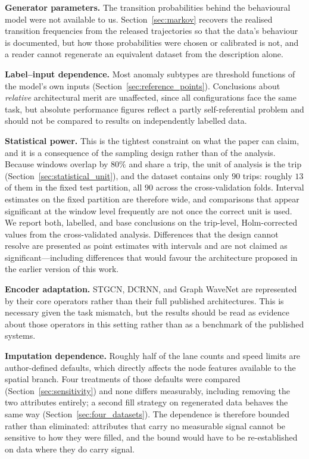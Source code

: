 \documentclass[journal]{IEEEtran}
\begin{document}
\textbf{Generator parameters.} The transition probabilities behind the behavioural model were not available to us. Section~\ref{sec:markov} recovers the realised transition frequencies from the released trajectories so that the data's behaviour is documented, but how those probabilities were chosen or calibrated is not, and a reader cannot regenerate an equivalent dataset from the description alone.

\textbf{Label--input dependence.} Most anomaly subtypes are threshold functions of the model's own inputs (Section~\ref{sec:reference_points}). Conclusions about \emph{relative} architectural merit are unaffected, since all configurations face the same task, but absolute performance figures reflect a partly self-referential problem and should not be compared to results on independently labelled data.

\textbf{Statistical power.} This is the tightest constraint on what the paper can claim, and it is a consequence of the sampling design rather than of the analysis. Because windows overlap by $80\%$ and share a trip, the unit of analysis is the trip (Section~\ref{sec:statistical_unit}), and the dataset contains only $90$ trips: roughly $13$ of them in the fixed test partition, all $90$ across the cross-validation folds. Interval estimates on the fixed partition are therefore wide, and comparisons that appear significant at the window level frequently are not once the correct unit is used. We report both, labelled, and base conclusions on the trip-level, Holm-corrected values from the cross-validated analysis. Differences that the design cannot resolve are presented as point estimates with intervals and are not claimed as significant---including differences that would favour the architecture proposed in the earlier version of this work.

\textbf{Encoder adaptation.} STGCN, DCRNN, and Graph WaveNet are represented by their core operators rather than their full published architectures. This is necessary given the task mismatch, but the results should be read as evidence about those operators in this setting rather than as a benchmark of the published systems.

\textbf{Imputation dependence.} Roughly half of the lane counts and speed limits are author-defined defaults, which directly affects the node features available to the spatial branch. Four treatments of those defaults were compared (Section~\ref{sec:sensitivity}) and none differs measurably, including removing the two attributes entirely; a second fill strategy on regenerated data behaves the same way (Section~\ref{sec:four_datasets}). The dependence is therefore bounded rather than eliminated: attributes that carry no measurable signal cannot be sensitive to how they were filled, and the bound would have to be re-established on data where they do carry signal.
\end{document}
